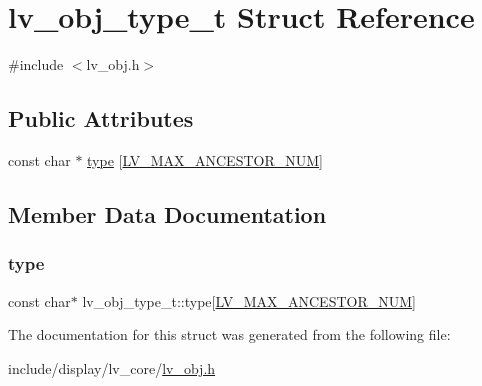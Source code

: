 \hypertarget{structlv__obj__type__t}{}\section{lv\+\_\+obj\+\_\+type\+\_\+t Struct Reference}
\label{structlv__obj__type__t}


{\ttfamily \#include $<$lv\+\_\+obj.\+h$>$}

\subsection*{Public Attributes}
\begin{DoxyCompactItemize}
\item 
const char $\ast$ \mbox{\hyperlink{structlv__obj__type__t_ae24e59ffdb8f2e285b26a743b03f1469}{type}} \mbox{[}\mbox{\hyperlink{lv__obj_8h_a928740e591ee641940bec3cb501e63e7}{L\+V\+\_\+\+M\+A\+X\+\_\+\+A\+N\+C\+E\+S\+T\+O\+R\+\_\+\+N\+UM}}\mbox{]}
\end{DoxyCompactItemize}


\subsection{Member Data Documentation}
\mbox{\label{structlv__obj__type__t_ae24e59ffdb8f2e285b26a743b03f1469}} 
\subsubsection{\texorpdfstring{type}{type}}
{\footnotesize\ttfamily const char$\ast$ lv\+\_\+obj\+\_\+type\+\_\+t\+::type\mbox{[}\mbox{\hyperlink{lv__obj_8h_a928740e591ee641940bec3cb501e63e7}{L\+V\+\_\+\+M\+A\+X\+\_\+\+A\+N\+C\+E\+S\+T\+O\+R\+\_\+\+N\+UM}}\mbox{]}}



The documentation for this struct was generated from the following file\+:\begin{DoxyCompactItemize}
\item 
include/display/lv\+\_\+core/\mbox{\hyperlink{lv__obj_8h}{lv\+\_\+obj.\+h}}\end{DoxyCompactItemize}
